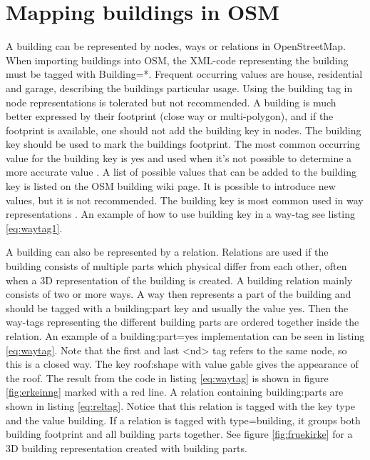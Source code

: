  \section{Mapping buildings in OSM}\label{buildOSM}
A building can be represented by nodes, ways or relations in OpenStreetMap. When importing buildings into OSM, the XML-code representing the building must be tagged with Building=*. Frequent occurring values are house, residential and garage, describing the buildings particular usage.  Using the building tag in node representations is tolerated but not recommended. A building is much better expressed by their footprint (close way or multi-polygon), and if the footprint is available, one should not add the building key in nodes. The building key should be used to mark the buildings footprint. The most common occurring value for the building key is yes and used when it's not possible to determine a more accurate value \cite{OpenStreetMapf}. A list of possible values that can be added to the building key is listed on the OSM building wiki page. It is possible to introduce new values, but it is not recommended. The building key is most common used in way representations \cite{TagInfo2016}. An example of how to use building key in a way-tag see listing \ref{eq:waytag1}.

A building can also be represented by a relation. Relations are used if the building consists of multiple parts which physical differ from each other, often when a 3D representation of the building is created. A building relation mainly consists of two or more ways. A way then represents a part of the building and should be tagged with a building:part key and usually the value yes. Then the way-tags representing the different building parts are ordered together inside the relation. An example of a building:part=yes implementation can be seen in listing \ref{eq:waytag}. Note that the first and last <nd> tag refers to the same node, so this is a closed way. The key roof:shape with value gable gives the appearance of the roof. The result from the code in listing \ref{eq:waytag} is shown in figure \ref{fig:erkeinng} marked with a red line. A relation containing building:parts are shown in listing \ref{eq:reltag}. Notice that this relation is tagged with the key type and the value building. If a relation is tagged with type=building, it groups both building footprint and all building parts together. See figure \ref{fig:fruekirke} for a 3D building representation created with building parts. 


